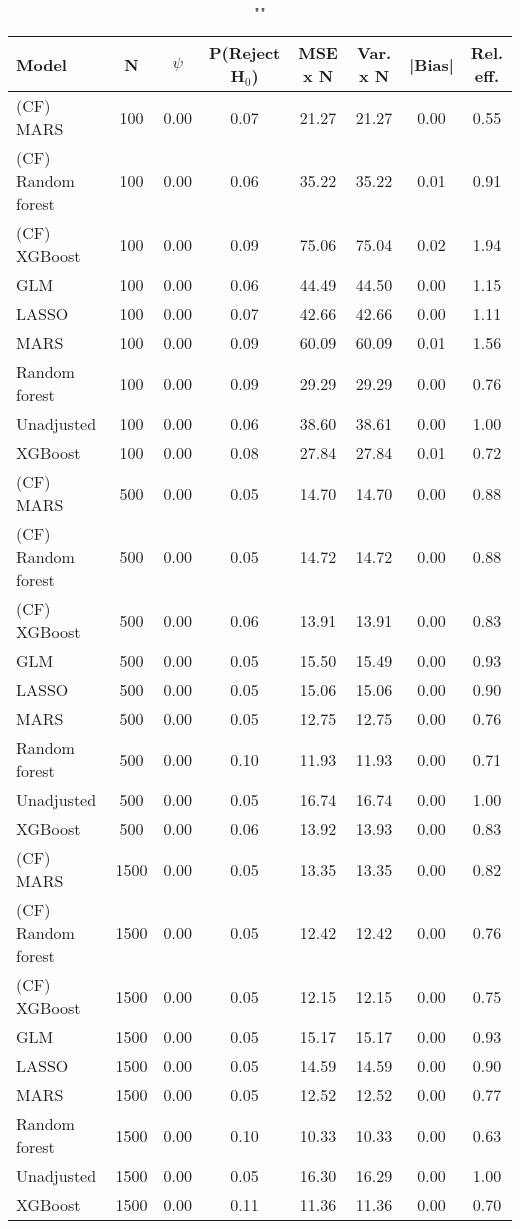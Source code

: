 \begin{table}
\centering
\caption{""}
\begin{tabular}{lccccccc}
\toprule
Model & N & $\psi$ & P(Reject H$_0$) & MSE x N & Var. x N & |Bias| & Rel. eff.\\ \midrule
(CF) MARS & 100 & 0.00 & 0.07 & 21.27 & 21.27 & 0.00 & 0.55 \\ 
(CF) Random forest & 100 & 0.00 & 0.06 & 35.22 & 35.22 & 0.01 & 0.91 \\ 
(CF) XGBoost & 100 & 0.00 & 0.09 & 75.06 & 75.04 & 0.02 & 1.94 \\ 
GLM & 100 & 0.00 & 0.06 & 44.49 & 44.50 & 0.00 & 1.15 \\ 
LASSO & 100 & 0.00 & 0.07 & 42.66 & 42.66 & 0.00 & 1.11 \\ 
MARS & 100 & 0.00 & 0.09 & 60.09 & 60.09 & 0.01 & 1.56 \\ 
Random forest & 100 & 0.00 & 0.09 & 29.29 & 29.29 & 0.00 & 0.76 \\ 
Unadjusted & 100 & 0.00 & 0.06 & 38.60 & 38.61 & 0.00 & 1.00 \\ 
XGBoost & 100 & 0.00 & 0.08 & 27.84 & 27.84 & 0.01 & 0.72 \\ \addlinespace 
(CF) MARS & 500 & 0.00 & 0.05 & 14.70 & 14.70 & 0.00 & 0.88 \\ 
(CF) Random forest & 500 & 0.00 & 0.05 & 14.72 & 14.72 & 0.00 & 0.88 \\ 
(CF) XGBoost & 500 & 0.00 & 0.06 & 13.91 & 13.91 & 0.00 & 0.83 \\ 
GLM & 500 & 0.00 & 0.05 & 15.50 & 15.49 & 0.00 & 0.93 \\ 
LASSO & 500 & 0.00 & 0.05 & 15.06 & 15.06 & 0.00 & 0.90 \\ 
MARS & 500 & 0.00 & 0.05 & 12.75 & 12.75 & 0.00 & 0.76 \\ 
Random forest & 500 & 0.00 & 0.10 & 11.93 & 11.93 & 0.00 & 0.71 \\ 
Unadjusted & 500 & 0.00 & 0.05 & 16.74 & 16.74 & 0.00 & 1.00 \\ 
XGBoost & 500 & 0.00 & 0.06 & 13.92 & 13.93 & 0.00 & 0.83 \\ \addlinespace 
(CF) MARS & 1500 & 0.00 & 0.05 & 13.35 & 13.35 & 0.00 & 0.82 \\ 
(CF) Random forest & 1500 & 0.00 & 0.05 & 12.42 & 12.42 & 0.00 & 0.76 \\ 
(CF) XGBoost & 1500 & 0.00 & 0.05 & 12.15 & 12.15 & 0.00 & 0.75 \\ 
GLM & 1500 & 0.00 & 0.05 & 15.17 & 15.17 & 0.00 & 0.93 \\ 
LASSO & 1500 & 0.00 & 0.05 & 14.59 & 14.59 & 0.00 & 0.90 \\ 
MARS & 1500 & 0.00 & 0.05 & 12.52 & 12.52 & 0.00 & 0.77 \\ 
Random forest & 1500 & 0.00 & 0.10 & 10.33 & 10.33 & 0.00 & 0.63 \\ 
Unadjusted & 1500 & 0.00 & 0.05 & 16.30 & 16.29 & 0.00 & 1.00 \\ 
XGBoost & 1500 & 0.00 & 0.11 & 11.36 & 11.36 & 0.00 & 0.70 \\
\bottomrule
\end{tabular}
\end{table}


